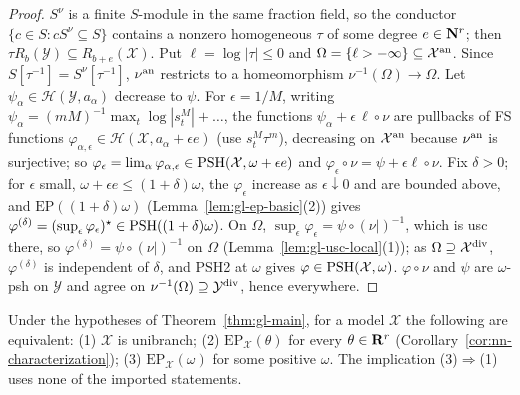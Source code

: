 \begin{proof}
$S^\nu$ is a finite $S$-module in the same fraction field, so the conductor $\{c\in S:cS^\nu\subseteq S\}$ contains a nonzero homogeneous $\tau$ of some degree $e\in\mathbf{N}^r$;
then $\tau R_b(\mathcal Y)\subseteq R_{b+e}(\mathcal X)$. Put $\ell=\log|\tau|\le0$ and $\Omega=\{\ell>-\infty\}\subseteq\mathcal X^{\mathrm{an}}$. Since $S[\tau^{-1}]=S^\nu[\tau^{-1}]$, $\nu^{\mathrm{an}}$
restricts to a homeomorphism $\nu^{-1}(\Omega)\to\Omega$. Let $\psi_\alpha\in\mathcal H(\mathcal Y,a_\alpha)$ decrease to $\psi$. For $\epsilon=1/M$, writing
$\psi_\alpha=(mM)^{-1}\max_t\log|s_t^M|+\dots$, the functions $\psi_\alpha+\epsilon\,\ell\circ\nu$ are pullbacks of FS functions $\varphi_{\alpha,\epsilon}\in\mathcal H(\mathcal X,
a_\alpha+\epsilon e)$ (use $s_t^M\tau^m$), decreasing on $\mathcal X^{\mathrm{an}}$ because $\nu^{\mathrm{an}}$ is surjective; so $\varphi_\epsilon=\lim_\alpha\varphi_{\alpha,\epsilon}\in\operatorname{PSH}(\mathcal
X,\omega+\epsilon e)$ and $\varphi_\epsilon\circ\nu=\psi+\epsilon\ell\circ\nu$. Fix $\delta>0$; for $\epsilon$ small, $\omega+\epsilon e\le(1+\delta)\omega$, the $\varphi_\epsilon$ increase as
$\epsilon\downarrow0$ and are bounded above, and $\mathrm{EP}((1+\delta)\omega)$ (Lemma~\ref{lem:gl-ep-basic}(2)) gives $\varphi^{(\delta)}=(\sup_\epsilon\varphi_\epsilon)^\star\in
\operatorname{PSH}((1+\delta)\omega)$. On $\Omega$, $\sup_\epsilon\varphi_\epsilon=\psi\circ(\nu|)^{-1}$, which is usc there, so $\varphi^{(\delta)}=\psi\circ(\nu|)^{-1}$ on $\Omega$
(Lemma~\ref{lem:gl-usc-local}(1)); as $\Omega\supseteq\mathcal X^{\mathrm{div}}$, $\varphi^{(\delta)}$ is independent of $\delta$, and PSH2 at $\omega$ gives
$\varphi\in\operatorname{PSH}(\mathcal X,\omega)$. $\varphi\circ\nu$ and $\psi$ are $\omega$-psh on $\mathcal Y$ and agree on $\nu^{-1}(\Omega)\supseteq\mathcal Y^{\mathrm{div}}$, hence
everywhere.
\end{proof}

\begin{corollary}\label{cor:gl-characterization}
\leanok
{}
Under the hypotheses of Theorem~\ref{thm:gl-main}, for a model $\mathcal X$ the following are equivalent: (1) $\mathcal X$ is unibranch; (2)
$\mathrm{EP}_{\mathcal X}(\theta)$ for every $\theta\in\mathbf{R}^r$ (Corollary~\ref{cor:nn-characterization}); (3) $\mathrm{EP}_{\mathcal X}(\omega)$ for some positive $\omega$. The implication
(3)$\Rightarrow$(1) uses none of the imported statements.
\end{corollary}

